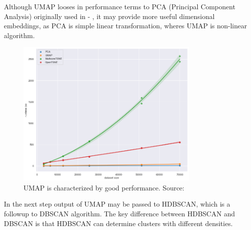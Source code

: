 Although UMAP looses in performance terms to PCA (Principal Component Analysis) originally used in \cite{Lach2022} - , it may provide more useful dimensional embeddings, as PCA is simple linear transformation, wheres UMAP is non-linear algorithm. 
\begin{figure}[H] 
  \centering     
  \includegraphics[width=0.8\textwidth]{img/performance_umap.png} 
  \caption{UMAP is characterized by good performance. Source: \cite{umapPerformance}}
  \label{fig:umap_performance}
\end{figure}

In the next step output of UMAP may be passed to HDBSCAN, which is a followup to DBSCAN algorithm.
The key difference between HDBSCAN and DBSCAN is that HDBSCAN can determine clusters with different densities.